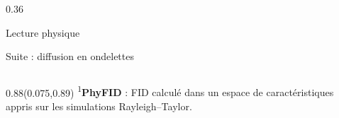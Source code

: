 \documentclass[t,10pt,aspectratio=169]{beamer}
\begin{document}
\begin{frame}
\begin{columns}[T,onlytextwidth]
\begin{column}{0.36\textwidth}
\begin{block}{Lecture physique}
      \end{block}

      \vspace{-1ex}
      \begin{alertblock}{Suite : diffusion en ondelettes}
      \end{alertblock}

    \end{column}
  \end{columns}
  \begin{textblock*}{0.88\paperwidth}(0.075\paperwidth,0.89\paperheight)
    {\tiny\color{CEAgrey}\textsuperscript{1}\textbf{PhyFID} : FID calculé dans un espace de caractéristiques appris sur les simulations Rayleigh--Taylor.}
  \end{textblock*}
\end{frame}

\begin{frame}[plain]
\end{frame}
\end{document}
